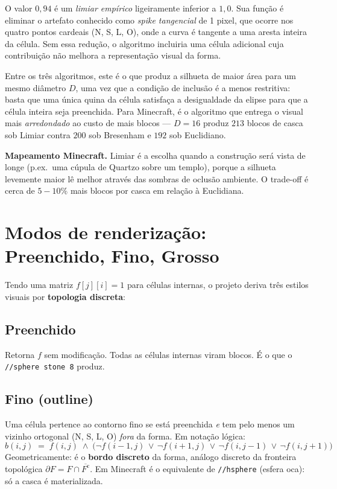 \documentclass[12pt,a4paper]{scrartcl}
\newcommand{\acc}[1]{\textcolor{accent}{\textbf{#1}}}
\newcommand{\cmd}[1]{\textcolor{earth}{\texttt{\small #1}}}
\begin{document}
O valor \acc{$0{,}94$} é um \emph{limiar empírico} ligeiramente inferior a $1{,}0$. Sua função é eliminar o artefato conhecido como \emph{spike tangencial} de 1 pixel, que ocorre nos quatro pontos cardeais (N, S, L, O), onde a curva é tangente a uma aresta inteira da célula. Sem essa redução, o algoritmo incluiria uma célula adicional cuja contribuição não melhora a representação visual da forma.

Entre os três algoritmos, este é o que produz a silhueta de maior área para um mesmo diâmetro $D$, uma vez que a condição de inclusão é a menos restritiva: basta que uma única quina da célula satisfaça a desigualdade da elipse para que a célula inteira seja preenchida. Para Minecraft, é o algoritmo que entrega o visual mais \emph{arredondado} ao custo de mais blocos --- $D=16$ produz $213$ blocos de casca sob Limiar contra $200$ sob Bresenham e $192$ sob Euclidiano.

\begin{minec}
\textbf{Mapeamento Minecraft.} Limiar é a escolha quando a construção será vista de longe (p.ex.\ uma cúpula de Quartzo sobre um templo), porque a silhueta levemente maior lê melhor através das sombras de oclusão ambiente. O trade-off é cerca de $5{-}10\%$ mais blocos por casca em relação à Euclidiana.
\end{minec}

\section{Modos de renderização: Preenchido, Fino, Grosso}

Tendo uma matriz $f[j][i] = 1$ para células internas, o projeto deriva três estilos visuais por \acc{topologia discreta}:

\subsection{Preenchido}
Retorna $f$ sem modificação. Todas as células internas viram blocos. É o que o \cmd{//sphere stone 8} produz.

\subsection{Fino (outline)}
Uma célula pertence ao contorno fino se está preenchida \emph{e} tem pelo menos um vizinho ortogonal (N, S, L, O) \emph{fora} da forma. Em notação lógica:
\[
b(i,j) \;=\; f(i,j) \;\wedge\;
\bigl(\neg f(i{-}1,j)\,\vee\,\neg f(i{+}1,j)\,\vee\,\neg f(i,j{-}1)\,\vee\,\neg f(i,j{+}1)\bigr)
\]
Geometricamente: é o \acc{bordo discreto} da forma, análogo discreto da fronteira topológica $\partial F = F \cap \overline{F^{\mathrm{c}}}$. Em Minecraft é o equivalente de \cmd{//hsphere} (esfera oca): só a casca é materializada.
\end{document}
